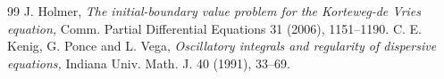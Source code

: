 \documentclass[10pt,a4paper]{amsart}
\theoremstyle{plain}
\theoremstyle{remark}
\begin{document}
\begin{thebibliography}{99}
 J. Holmer, {\it The initial-boundary value problem for the Korteweg-de Vries equation,} Comm. Partial Differential Equations 31 (2006), 1151--1190.
 C. E. Kenig, G. Ponce and L. Vega, {\it Oscillatory integrals and regularity of dispersive equations,} Indiana Univ. Math. J. 40 (1991), 33--69.
\end{thebibliography}
\end{document}
